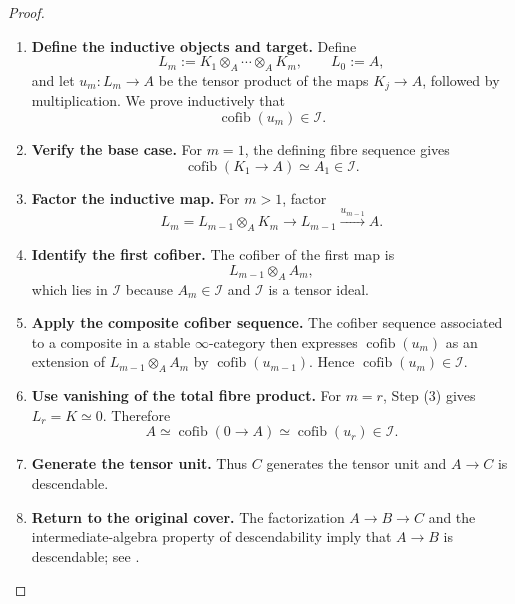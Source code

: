 \begin{proof}
\begin{enumerate}[label=\textup{(\arabic*)}]
    \item \textbf{Define the inductive objects and target.}
    Define
    \[
        L_m:=K_1\otimes_A\cdots\otimes_AK_m,
        \qquad
        L_0:=A,
    \]
    and let \(u_m:L_m\to A\) be the tensor product of the maps
    \(K_j\to A\), followed by multiplication. We prove inductively that
    \[
        \operatorname{cofib}(u_m)\in\mathcal I.
    \]

    \item \textbf{Verify the base case.}
    For \(m=1\), the defining fibre sequence gives
    \[
        \operatorname{cofib}(K_1\to A)\simeq A_1\in\mathcal I.
    \]

    \item \textbf{Factor the inductive map.}
    For \(m>1\), factor
    \[
        L_m=L_{m-1}\otimes_AK_m
        \longrightarrow
        L_{m-1}
        \xrightarrow{u_{m-1}}
        A.
    \]

    \item \textbf{Identify the first cofiber.}
    The cofiber of the first map is
    \[
        L_{m-1}\otimes_AA_m,
    \]
    which lies in \(\mathcal I\) because \(A_m\in\mathcal I\) and
    \(\mathcal I\) is a tensor ideal.

    \item \textbf{Apply the composite cofiber sequence.}
    The cofiber sequence associated to a
    composite in a stable \(\infty\)-category then expresses
    \(\operatorname{cofib}(u_m)\) as an extension of
    \(L_{m-1}\otimes_AA_m\) by
    \(\operatorname{cofib}(u_{m-1})\). Hence
    \(\operatorname{cofib}(u_m)\in\mathcal I\).

    \item \textbf{Use vanishing of the total fibre product.}
    For \(m=r\), Step \textup{(3)} gives \(L_r=K\simeq0\). Therefore
    \[
        A
        \simeq
        \operatorname{cofib}(0\to A)
        \simeq
        \operatorname{cofib}(u_r)
        \in
        \mathcal I.
    \]

    \item \textbf{Generate the tensor unit.}
    Thus \(C\) generates the tensor unit and \(A\to C\) is descendable.

    \item \textbf{Return to the original cover.}
    The factorization \(A\to B\to C\) and the intermediate-algebra property
    of descendability imply that \(A\to B\) is descendable; see
    \cite[Proposition~3.24]{MathewGaloisStableHomotopy}.
\end{enumerate}
\end{proof}

